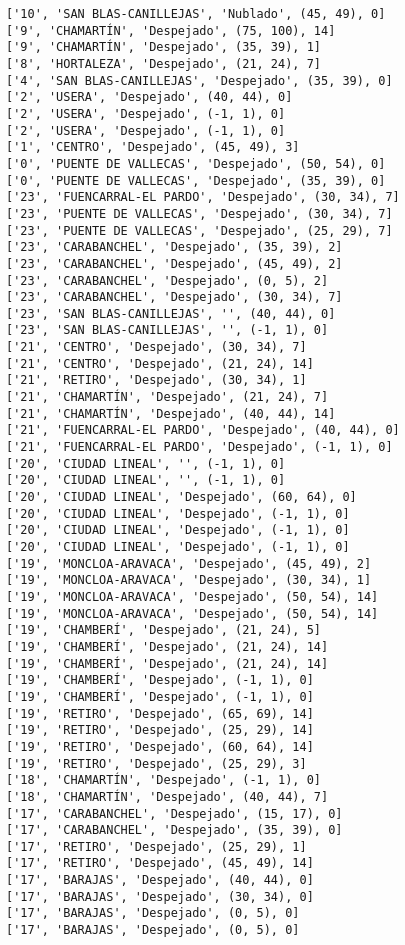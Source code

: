 \documentclass[11pt]{article}
\begin{document}
\begin{Verbatim}[commandchars=\\\{\}]
['10', 'SAN BLAS-CANILLEJAS', 'Nublado', (45, 49), 0]
['9', 'CHAMARTÍN', 'Despejado', (75, 100), 14]
['9', 'CHAMARTÍN', 'Despejado', (35, 39), 1]
['8', 'HORTALEZA', 'Despejado', (21, 24), 7]
['4', 'SAN BLAS-CANILLEJAS', 'Despejado', (35, 39), 0]
['2', 'USERA', 'Despejado', (40, 44), 0]
['2', 'USERA', 'Despejado', (-1, 1), 0]
['2', 'USERA', 'Despejado', (-1, 1), 0]
['1', 'CENTRO', 'Despejado', (45, 49), 3]
['0', 'PUENTE DE VALLECAS', 'Despejado', (50, 54), 0]
['0', 'PUENTE DE VALLECAS', 'Despejado', (35, 39), 0]
['23', 'FUENCARRAL-EL PARDO', 'Despejado', (30, 34), 7]
['23', 'PUENTE DE VALLECAS', 'Despejado', (30, 34), 7]
['23', 'PUENTE DE VALLECAS', 'Despejado', (25, 29), 7]
['23', 'CARABANCHEL', 'Despejado', (35, 39), 2]
['23', 'CARABANCHEL', 'Despejado', (45, 49), 2]
['23', 'CARABANCHEL', 'Despejado', (0, 5), 2]
['23', 'CARABANCHEL', 'Despejado', (30, 34), 7]
['23', 'SAN BLAS-CANILLEJAS', '', (40, 44), 0]
['23', 'SAN BLAS-CANILLEJAS', '', (-1, 1), 0]
['21', 'CENTRO', 'Despejado', (30, 34), 7]
['21', 'CENTRO', 'Despejado', (21, 24), 14]
['21', 'RETIRO', 'Despejado', (30, 34), 1]
['21', 'CHAMARTÍN', 'Despejado', (21, 24), 7]
['21', 'CHAMARTÍN', 'Despejado', (40, 44), 14]
['21', 'FUENCARRAL-EL PARDO', 'Despejado', (40, 44), 0]
['21', 'FUENCARRAL-EL PARDO', 'Despejado', (-1, 1), 0]
['20', 'CIUDAD LINEAL', '', (-1, 1), 0]
['20', 'CIUDAD LINEAL', '', (-1, 1), 0]
['20', 'CIUDAD LINEAL', 'Despejado', (60, 64), 0]
['20', 'CIUDAD LINEAL', 'Despejado', (-1, 1), 0]
['20', 'CIUDAD LINEAL', 'Despejado', (-1, 1), 0]
['20', 'CIUDAD LINEAL', 'Despejado', (-1, 1), 0]
['19', 'MONCLOA-ARAVACA', 'Despejado', (45, 49), 2]
['19', 'MONCLOA-ARAVACA', 'Despejado', (30, 34), 1]
['19', 'MONCLOA-ARAVACA', 'Despejado', (50, 54), 14]
['19', 'MONCLOA-ARAVACA', 'Despejado', (50, 54), 14]
['19', 'CHAMBERÍ', 'Despejado', (21, 24), 5]
['19', 'CHAMBERÍ', 'Despejado', (21, 24), 14]
['19', 'CHAMBERÍ', 'Despejado', (21, 24), 14]
['19', 'CHAMBERÍ', 'Despejado', (-1, 1), 0]
['19', 'CHAMBERÍ', 'Despejado', (-1, 1), 0]
['19', 'RETIRO', 'Despejado', (65, 69), 14]
['19', 'RETIRO', 'Despejado', (25, 29), 14]
['19', 'RETIRO', 'Despejado', (60, 64), 14]
['19', 'RETIRO', 'Despejado', (25, 29), 3]
['18', 'CHAMARTÍN', 'Despejado', (-1, 1), 0]
['18', 'CHAMARTÍN', 'Despejado', (40, 44), 7]
['17', 'CARABANCHEL', 'Despejado', (15, 17), 0]
['17', 'CARABANCHEL', 'Despejado', (35, 39), 0]
['17', 'RETIRO', 'Despejado', (25, 29), 1]
['17', 'RETIRO', 'Despejado', (45, 49), 14]
['17', 'BARAJAS', 'Despejado', (40, 44), 0]
['17', 'BARAJAS', 'Despejado', (30, 34), 0]
['17', 'BARAJAS', 'Despejado', (0, 5), 0]
['17', 'BARAJAS', 'Despejado', (0, 5), 0]

\end{Verbatim}
\end{document}
